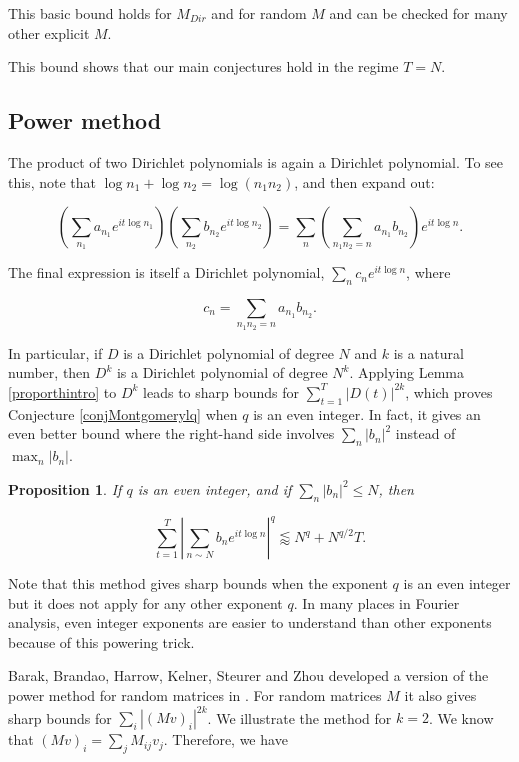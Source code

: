 \documentclass{amsart}
\newtheorem{prop}{Proposition}[section]
\begin{document}
This basic bound holds for $M_{Dir}$ and for random $M$ and can be checked for many other explicit $M$. 

This bound shows that our main conjectures hold in the regime $T = N$.   



\subsection{Power method}

The product of two Dirichlet polynomials is again a Dirichlet polynomial.   To see this,  note that $\log n_1 + \log n_2 =\log (n_1 n_2)$, and then expand out:

$$\left( \sum_{n_1} a_{n_1} e^{i t \log n_1} \right) \left( \sum_{n_2} b_{n_2} e^{i t \log n_2} \right) = \sum_{n} \left( \sum_{n_1 n_2 = n} a_{n_1} b_{n_2} \right) e^{i t \log n}. $$

The final expression is itself a Dirichlet polynomial,  $\sum_n c_n e^{i t \log n}$,  where

$$ c_n = \sum_{n_1 n_2 = n} a_{n_1} b_{n_2}. $$

In particular,  if $D$ is a Dirichlet polynomial of degree $N$ and $k$ is a natural number,  then $D^k$ is a Dirichlet polynomial of degree $N^k$.   Applying Lemma \ref{proporthintro} to $D^k$ leads to sharp bounds for  $\sum_{t=1}^T |D(t)|^{2k}$,  which proves Conjecture \ref{conjMontgomerylq} when $q$ is an even integer.   In fact,  it gives an even better bound where the right-hand side involves $\sum_n |b_n|^2$ instead of $\max_n |b_n|$.  

\begin{prop} \label{propstronglq}
 If $q$ is an even integer,  and if $\sum_n |b_n|^2 \le N$, then

\begin{equation} \label{stronglq}
\sum_{t=1}^T \left| \sum_{n \sim N} b_n e^{it \log n} \right|^q \lessapprox N^q + N^{q/2} T.
\end{equation}

\end{prop}

Note that this method gives sharp bounds when the exponent $q$ is an even integer but it does not apply for any other exponent $q$.   In many places in Fourier analysis,  even integer exponents are easier to understand than other exponents because of this powering trick.

Barak,  Brandao,  Harrow, Kelner, Steurer and Zhou developed a version of the power method for random matrices in \cite{BBHKSZ}.  
For random matrices $M$ it also gives sharp bounds for $\sum_i |(Mv)_i |^{2k}$.    We illustrate the method for $k=2$.   We know that $(Mv)_i = \sum_j M_{ij} v_j$.   Therefore,  we have
\end{document}
